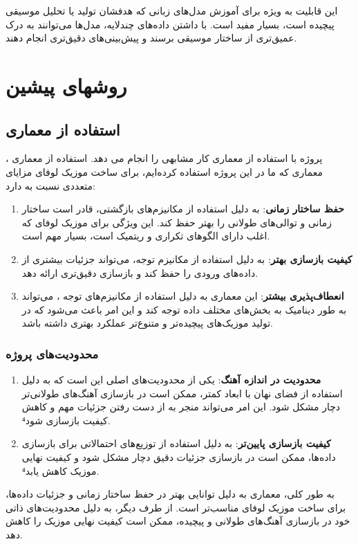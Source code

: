 این قابلیت به ویژه برای آموزش مدل‌های زبانی که هدفشان تولید یا تحلیل موسیقی پیچیده است، بسیار مفید است. با داشتن داده‌های چندلایه، مدل‌ها می‌توانند به درک عمیق‌تری از ساختار موسیقی برسند و پیش‌بینی‌های دقیق‌تری انجام دهند.

\section{روشهای پيشين}
\subsection{استفاده از معماری }
پروژه  \cite{Zhang} با استفاده از معماری  کار مشابهی را انجام می دهد.
استفاده از معماری ، معماری که ما در این پروژه استفاده کرده‌ایم، برای ساخت موزیک
لوفای  مزایای متعددی نسبت به   دارد:

\begin{enumerate}
      \def\labelenumi{\arabic{enumi}.}
      \item
            \textbf{حفظ ساختار زمانی}:  به دلیل استفاده از مکانیزم‌های بازگشتی،
            قادر است ساختار زمانی و توالی‌های طولانی را بهتر حفظ کند. این ویژگی
            برای موزیک لوفای که اغلب دارای الگوهای تکراری و ریتمیک است، بسیار مهم
            است.
      \item
            \textbf{کیفیت بازسازی بهتر}:  به دلیل استفاده از مکانیزم توجه، می‌تواند جزئیات بیشتری از داده‌های ورودی را حفظ کند و بازسازی
            دقیق‌تری ارائه دهد.
      \item
            \textbf{انعطاف‌پذیری بیشتر}: این معماری به دلیل استفاده از مکانیزم‌های
            توجه  ، می‌تواند به طور دینامیک به بخش‌های مختلف داده توجه کند و این امر
            باعث می‌شود که در تولید موزیک‌های پیچیده‌تر و متنوع‌تر عملکرد بهتری داشته
            باشد.
\end{enumerate}

\subsubsection{محدودیت‌های
     پروژه }

\begin{enumerate}
      \def\labelenumi{\arabic{enumi}.}
      \item
            \textbf{محدودیت در اندازه آهنگ}: یکی از محدودیت‌های اصلی  این است که
            به دلیل استفاده از فضای نهان با ابعاد کمتر، ممکن است در بازسازی
            آهنگ‌های طولانی‌تر دچار مشکل شود. این امر می‌تواند منجر به از دست رفتن
            جزئیات مهم و کاهش کیفیت بازسازی شود⁴.
      \item
            \textbf{کیفیت بازسازی پایین‌تر}:  به دلیل استفاده از توزیع‌های
            احتمالاتی برای بازسازی داده‌ها، ممکن است در بازسازی جزئیات دقیق دچار
            مشکل شود و کیفیت نهایی موزیک کاهش یابد⁴.
\end{enumerate}
به طور کلی، معماری  به دلیل توانایی بهتر در حفظ ساختار زمانی و
جزئیات داده‌ها، برای ساخت موزیک لوفای مناسب‌تر است. از طرف دیگر،  به
دلیل محدودیت‌های ذاتی خود در بازسازی آهنگ‌های طولانی و پیچیده، ممکن است
کیفیت نهایی موزیک را کاهش دهد.

